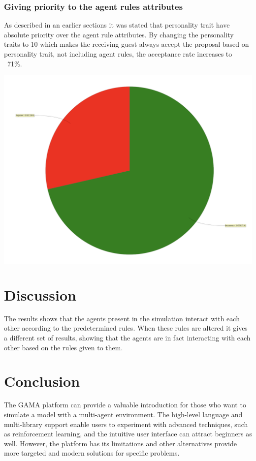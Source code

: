 \documentclass[a4paper,10pt]{article}
\begin{document}
\subsubsection{Giving priority to the agent rules attributes}
As described in an earlier sections it was stated that personality trait have absolute priority over the agent rule attributes. By changing the personality traits to 10 which makes the receiving guest always accept the proposal based on personality trait, not including agent rules, the acceptance rate increases to ~71\%.

\begin{center}{}
\centering\includegraphics[scale=0.05]{priority.png}\par
\end{center}

\section{Discussion}
The results shows that the agents present in the simulation interact with each other according to the predetermined rules. When these rules are altered it gives a different set of results, showing that the agents are in fact interacting with each other based on the rules given to them. 

\section{Conclusion}
The GAMA platform can provide a valuable introduction for those who want to simulate a model with a multi-agent environment. The high-level language and multi-library support enable users to experiment with advanced techniques, such as reinforcement learning, and the intuitive user interface can attract beginners as well. However, the platform has its limitations and other alternatives provide more targeted and modern solutions for specific problems. 
\end{document}
